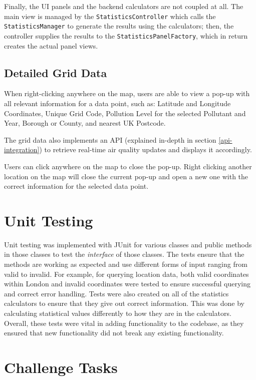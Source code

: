 \documentclass[10pt, a4paper]{scrartcl}
\begin{document}
\begin{multicols}{2}
\noindent Finally, the UI panels and the backend calculators are not coupled at all. The main view is managed by the
\verb|StatisticsController| which calls the \verb|StatisticsManager| to generate the results using the calculators; then,
the controller supplies the results to the \verb|StatisticsPanelFactory|, which in return creates the actual panel views.

\subsection{Detailed Grid Data}

\noindent When right-clicking anywhere on the map, users are able to view a pop-up with all relevant information for a data
point, such as: Latitude and Longitude Coordinates, Unique Grid Code, Pollution Level for the selected Pollutant and Year,
Borough or County, and nearest UK Postcode. 
    
\noindent The grid data also implements an API (explained in-depth in section \ref{api-integration}) to retrieve real-time
air quality updates and displays it accordingly.
    
\noindent Users can click anywhere on the map to close the pop-up. Right clicking another location on the map will
close the current pop-up and open a new one with the correct information for the selected data point.

\section{Unit Testing}

\noindent Unit testing was implemented with JUnit for various classes and public methods in those classes to test the
\textit{interface} of those classes. The tests ensure that the methods are working as expected and use different forms
of input ranging from valid to invalid. For example, for querying location data, both valid coordinates within London
and invalid coordinates were tested to ensure successful querying and correct error handling. Tests were also created
on all of the statistics calculators to ensure that they give out correct information. This was done by calculating statistical
values differently to how they are in the calculators. Overall, these tests were vital in adding functionality to the codebase,
as they ensured that new functionality did not break any existing functionality.

\section{Challenge Tasks} \label{challenge-tasks}


\end{multicols}
\end{document}

